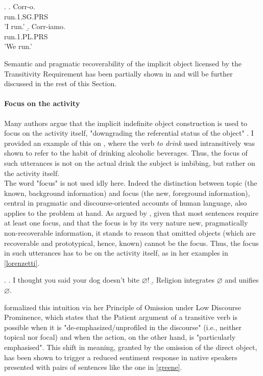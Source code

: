 \ex. \label{epp_intro} \a. \label{epp_intro1} Corr-o. \\ run.1.SG.PRS \\ 'I run.'
\b. \label{epp_intro2} Corr-iamo. \\ run.1.PL.PRS \\ 'We run.'

Semantic and pragmatic recoverability of the implicit object licensed by the Transitivity Requirement has been partially shown in  and will be further discussed in the rest of this Section.


\paragraph{Focus on the activity} 

Many authors \parencite{Liu2008, Garcia-VelascoMunoz2002, Fillmore1986, Ahringberg2015, Levin1993, Yasutake1987, Goldberg2005} argue that the implicit indefinite object construction is used to focus on the activity itself, "downgrading the referential status of the object" \parencite[7-8]{Garcia-VelascoMunoz2002}. I provided an example of this on , where the verb \textit{to drink} used intransitively was shown to refer to the habit of drinking alcoholic beverages. Thus, the focus of such utterances is not on the actual drink the subject is imbibing, but rather on the activity itself.\\
The word "focus" is not used idly here. Indeed the distinction between topic (the known, background information) and focus (the new, foreground information), central in pragmatic and discourse-oriented accounts of human language, also applies to the problem at hand. As argued by \textcite[66]{Lorenzetti2008}, given that most sentences require at least one focus, and that the focus is by its very nature new, pragmatically non-recoverable information, it stands to reason that omitted objects (which are recoverable and prototypical, hence, known) cannot be the focus. Thus, the focus in such utterances has to be on the activity itself, as in her examples in \ref{lorenzetti}.

\ex. \label{lorenzetti} \a. \label{lorenzetti1} I thought you said your dog doesn’t bite $\varnothing$!
\b. \label{lorenzetti2} Religion integrates $\varnothing$ and unifies $\varnothing$.

\textcite{Goldberg2005} formalized this intuition via her Principle of Omission under Low Discourse Prominence, which states that the Patient argument of a transitive verb is possible when it is "de-emphasized/unprofiled in the discourse" (i.e., neither topical nor focal) and when the action, on the other hand, is "particularly emphasised". This shift in meaning, granted by the omission of the direct object, has been shown \parencite[507]{GreeneResnik2009more} to trigger a reduced sentiment response in native speakers presented with pairs of sentences like the one in \ref{greene}.

